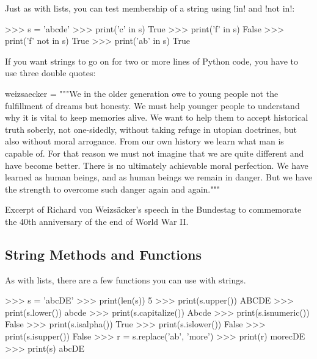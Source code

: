 \documentclass[11pt]{cselabheader}
\begin{document}
Just as with lists, you can test membership of a string using \pythoninline!in! and
\pythoninline!not in!:

\begin{pyconcode}
>>> s = 'abcde'
>>> print('c' in s)
True
>>> print('f' in s)
False
>>> print('f' not in s)
True
>>> print('ab' in s)
True
\end{pyconcode}

If you want strings to go on for two or more lines of Python code, you have to use three double
quotes:

\begin{listing}[H]
  \vspace{-0.5em}
\begin{python3code}
weizsaecker = """We in the older generation owe to young people not the 
fulfillment of dreams but honesty. We must help younger people to 
understand why it is vital to keep memories alive. We want to help them 
to accept historical truth soberly, not one-sidedly, without taking 
refuge in utopian doctrines, but also without moral arrogance. From our
own history we learn what man is capable of. For that reason we must not
imagine that we are quite different and have become better. There is no
ultimately achievable moral perfection. We have learned as human beings,
and as human beings we remain in danger. But we have the strength to 
overcome such danger again and again."""
\end{python3code}
  \vspace{-1em}
  \caption{Excerpt of Richard von Weizs\"{a}cker's speech in
the Bundestag to commemorate the 40th anniversary of the end of World War II.}
  \vspace{-0.5em}
\end{listing}

\subsection{String Methods and Functions}

As with lists, there are a few functions you can use with strings.

\begin{pyconcode}
>>> s = 'abcDE'
>>> print(len(s))
5
>>> print(s.upper())
ABCDE
>>> print(s.lower())
abcde
>>> print(s.capitalize())
Abcde
>>> print(s.isnumeric())
False
>>> print(s.isalpha())
True
>>> print(s.islower())
False
>>> print(s.isupper())
False
>>> r = s.replace('ab', 'more')
>>> print(r)
morecDE
>>> print(s)
abcDE
\end{pyconcode}
\end{document}
